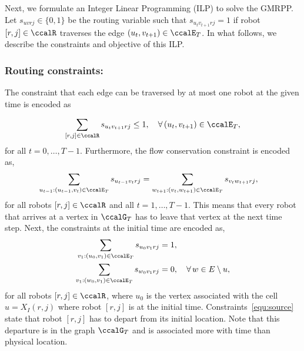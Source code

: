 \documentclass[Afour,sageh,times]{sagej}
\begin{document}
{{{Next, we formulate an Integer Linear Programming (ILP) to solve the GMRPP. Let $s_{uvrj} \in\{0,1\}$ be the routing variable such that $s_{u_{t}v_{t+1}rj} = 1$ if robot $[r,j] \in \ccalR$ traverses the edge $(u_t,v_{t+1}) \in \ccalE_T$. In what follows, we describe the constraints and objective of this ILP.

\subsubsection{Routing constraints:}
The constraint that each edge can be traversed by at most one robot at the given time is encoded as}
\begin{align}
  \sum_{[r,j] \in \ccalR} s_{u_t v_{t+1}rj} \leq 1, \quad \forall \,(u_t,v_{t+1}) \in \ccalE_T,
\end{align}
for all $t=0,\ldots, T-1$. Furthermore, the flow conservation constraint is encoded as,
  \begin{align}\label{equ:flow}
  \sum_{u_{t-1}:(u_{t-1}, v_t) \in \ccalE_T}   s_{u_{t-1} v_t rj} &  =   \sum_{w_{t+1}:(v_t, w_{t+1}) \in \ccalE_T} s_{v_t w_{t+1} rj},
  \end{align}
for all robots $[r,j]\in \ccalR$ and all $t=1,\ldots,T-1$. This means that every robot that arrives at a vertex in $\ccalG_T$ has to leave that vertex at the next time step. Next, the constraints at the initial time are encoded as,
\begin{subequations}\label{equ:source}
  \begin{align}
    \sum_{v_1:(u_0, v_1) \in \ccalE_T} s_{u_0v_1 rj} &  = 1,  \\
    \sum_{v_1:(w_0, v_1) \in \ccalE_T} s_{w_0v_1 rj} & = 0, \quad \forall\, w \in E\setminus u,
  \end{align}
\end{subequations}
for all robots $[r,j]\in \ccalR$, where $u_0$ is the vertex associated with the cell $u = X_I(r,j)$ where robot $[r,j]$ is at the initial time. Constraints~\eqref{equ:source} state that robot $[r,j]$ has to depart from its initial location. Note that this departure is in the graph $\ccalG_T$ and is associated more with time than physical location.

}}
\end{document}
